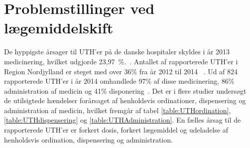 
\section{Problemstillinger ved lægemiddelskift}

De hyppigste årsager til UTH'er på de danske hospitaler skyldes i år 2013 medicinering, hvilket udgjorde 23,97~\%.~\citep{Patientombuddet2013}. Antallet af rapporterede UTH'er i Region Nordjylland er steget med over 36\% fra år 2012 til 2014 ~\citep{Jensen2014}. Ud af 824 rapporterede UTH'er i år 2014 omhandlede 97\% af disse medicinering, 86\% administration af medicin og 41\% disponering~\citep{Jensen2014}. Det er i flere studier undersøgt de utilsigtede hændelser forårsaget af henholdsvis ordinationer, dispensering og administration af medicin, hvilket fremgår af tabel \ref{table:UTHordination}, \ref{table:UTHdispensering} og \ref{table:UTHAdministration}. En fælles årsag til de rapporterede UTH'er er forkert dosis, forkert lægemiddel og udeladelse af henholdsvis ordination, dispensering og administration.

